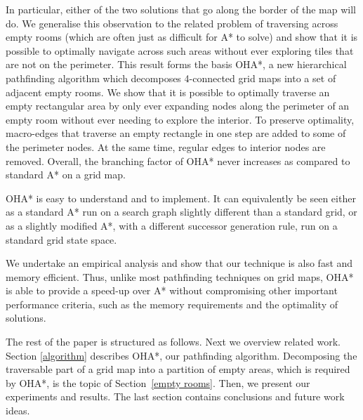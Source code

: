 In particular, either of the two solutions that go along the border of the map will do.
We generalise this observation to the related problem of traversing across empty rooms (which are 
often just as difficult for A* to solve) and show that it is possible to optimally navigate across 
such areas without ever exploring tiles that are not on the perimeter.
This result forms the basis OHA*, a new hierarchical pathfinding algorithm which 
decomposes 4-connected grid maps into a set of adjacent empty rooms.
We show that it is possible to optimally traverse an empty rectangular area by only ever expanding nodes along the perimeter of an empty room without ever needing to explore the interior.
To preserve optimality, macro-edges that traverse an empty rectangle in one step are added to some of the perimeter nodes. 
At the same time, regular edges to interior nodes are removed.
Overall, the branching factor of OHA* never increases as compared to standard A* on a grid map.
\par
OHA* is easy to understand and to implement. It can equivalently be seen either as
a standard A* run on a search graph slightly different than a standard grid, or
as a slightly modified A*, with a different successor generation rule,
run on a standard grid state space.
\par
We undertake an empirical analysis and show that our technique is also fast and memory efficient.
Thus, unlike most pathfinding techniques on grid maps, OHA* is able to provide a speed-up over A*
without compromising other important performance criteria, such as the memory requirements
and the optimality of solutions.

The rest of the paper is structured as follows.
Next we overview related work.
Section \ref{algorithm} describes OHA*, our pathfinding algorithm.
Decomposing the traversable part of a grid map into a partition of empty areas,
which is required by OHA*, is the topic of Section~\ref{empty rooms}.
Then, we present our experiments and results.
The last section contains conclusions and future work ideas.

